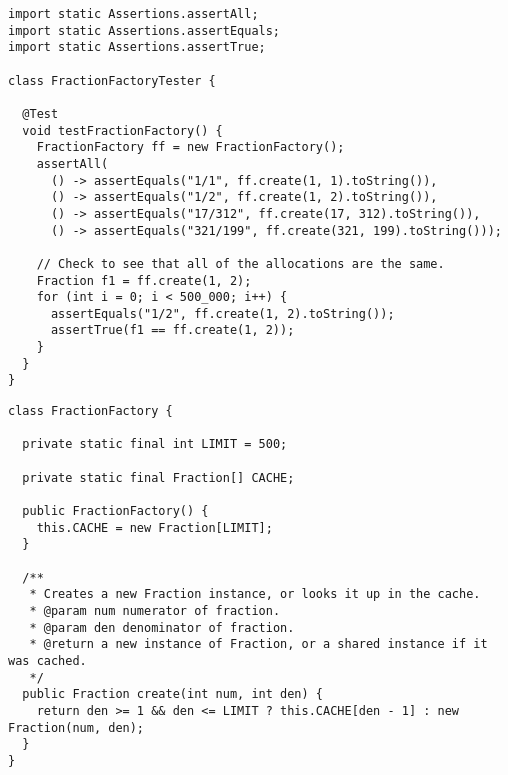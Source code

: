 \begin{cl}{}
\begin{lstlisting}[language=MyJava]
import static Assertions.assertAll;
import static Assertions.assertEquals;
import static Assertions.assertTrue;

class FractionFactoryTester {

  @Test
  void testFractionFactory() {
    FractionFactory ff = new FractionFactory();
    assertAll(
      () -> assertEquals("1/1", ff.create(1, 1).toString()),
      () -> assertEquals("1/2", ff.create(1, 2).toString()),
      () -> assertEquals("17/312", ff.create(17, 312).toString()),
      () -> assertEquals("321/199", ff.create(321, 199).toString()));

    // Check to see that all of the allocations are the same.
    Fraction f1 = ff.create(1, 2);
    for (int i = 0; i < 500_000; i++) {
      assertEquals("1/2", ff.create(1, 2).toString());
      assertTrue(f1 == ff.create(1, 2));
    }
  }
}
\end{lstlisting}
\end{cl}

\begin{cl}{}
\begin{lstlisting}[language=MyJava]
class FractionFactory {

  private static final int LIMIT = 500;
  
  private static final Fraction[] CACHE;

  public FractionFactory() {
    this.CACHE = new Fraction[LIMIT];
  }

  /**
   * Creates a new Fraction instance, or looks it up in the cache.
   * @param num numerator of fraction.
   * @param den denominator of fraction.
   * @return a new instance of Fraction, or a shared instance if it was cached.
   */
  public Fraction create(int num, int den) {
    return den >= 1 && den <= LIMIT ? this.CACHE[den - 1] : new Fraction(num, den);
  }
}
\end{lstlisting}
\end{cl}



